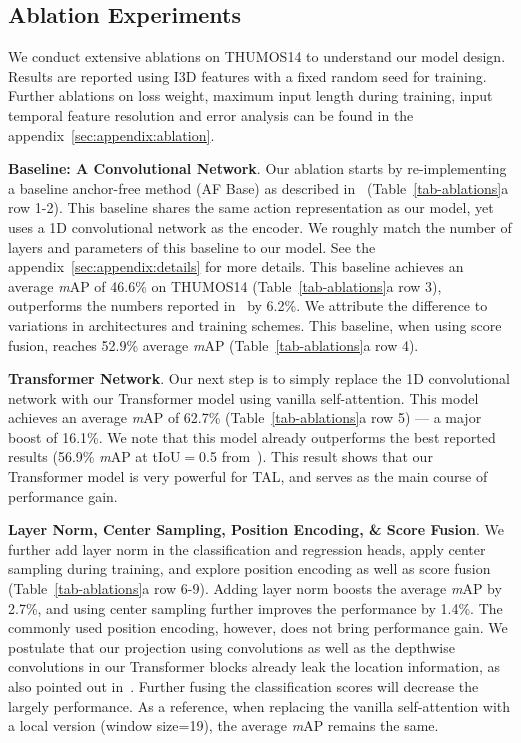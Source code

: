 \subsection{Ablation Experiments}\label{sec:exp:ablation}
We conduct extensive ablations on THUMOS14 to understand our model design. Results are reported using I3D features with a fixed random seed for training. Further ablations on loss weight, maximum input length during training, input temporal feature resolution and error analysis can be found in the appendix~\ref{sec:appendix:ablation}.


\smallskip
\noindent \textbf{Baseline: A Convolutional Network}. Our ablation starts by re-implementing a baseline anchor-free method (AF Base) as described in~\cite{a2nettip2020,afsdcvpr2021} (Table~\ref{tab-ablations}a row 1-2). This baseline shares the same action representation as our model, yet uses a 1D convolutional network as the encoder. We roughly match the number of layers and parameters of this baseline to our model. See the appendix~\ref{sec:appendix:details} for more details. This baseline achieves an average \textit{m}AP of 46.6\% on THUMOS14 (Table~\ref{tab-ablations}a row 3), outperforms the numbers reported in~\cite{afsdcvpr2021} by 6.2\%. We attribute the difference to variations in architectures and training schemes. This baseline, when using score fusion, reaches 52.9\% average \textit{m}AP (Table~\ref{tab-ablations}a row 4). 

\smallskip
\noindent \textbf{Transformer Network}. Our next step is to simply replace the 1D convolutional network with our Transformer model using vanilla self-attention. This model achieves an average \textit{m}AP of 62.7\% (Table~\ref{tab-ablations}a row 5) --- a major boost of 16.1\%. We note that this model already outperforms the best reported results (56.9\% \textit{m}AP at tIoU$=$0.5 from~\cite{liu2021multi}). This result shows that our Transformer model is very powerful for TAL, and serves as the main course of performance gain. 



\smallskip
\noindent \textbf{Layer Norm, Center Sampling, Position Encoding, \& Score Fusion}. We further add layer norm in the classification and regression heads, apply center sampling during training, and explore position encoding as well as score fusion (Table~\ref{tab-ablations}a row 6-9). Adding layer norm boosts the average \textit{m}AP by 2.7\%, and using center sampling further improves the performance by 1.4\%. The commonly used position encoding, however, does not bring performance gain. We postulate that our projection using convolutions as well as the depthwise convolutions in our Transformer blocks already leak the location information, as also pointed out in~\cite{xie2021segformer}. Further fusing the classification scores will decrease the largely performance. As a reference, when replacing the vanilla self-attention with a local version (window size=19), the average \textit{m}AP remains the same.

